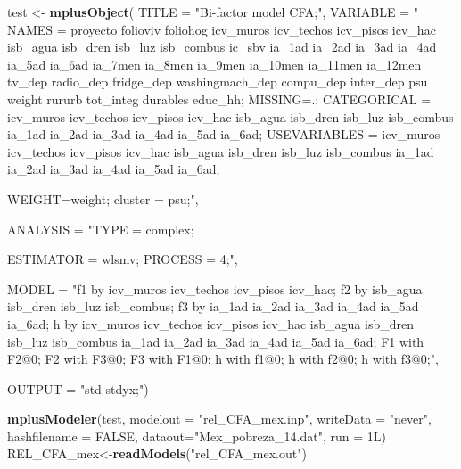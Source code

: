 \documentclass[]{book}
\newenvironment{Shaded}{\begin{snugshade}}{\end{snugshade}}
\newcommand{\DataTypeTok}[1]{\textcolor[rgb]{0.13,0.29,0.53}{#1}}
\newcommand{\KeywordTok}[1]{\textcolor[rgb]{0.13,0.29,0.53}{\textbf{#1}}}
\newcommand{\NormalTok}[1]{#1}
\newcommand{\OtherTok}[1]{\textcolor[rgb]{0.56,0.35,0.01}{#1}}
\newcommand{\StringTok}[1]{\textcolor[rgb]{0.31,0.60,0.02}{#1}}
\begin{document}
\begin{Shaded}
\begin{Highlighting}[]
\NormalTok{test <-}\StringTok{ }\KeywordTok{mplusObject}\NormalTok{(}
\DataTypeTok{TITLE =} \StringTok{"Bi-factor model CFA;"}\NormalTok{,}
   \DataTypeTok{VARIABLE =} \StringTok{"}
\StringTok{     NAMES = proyecto folioviv foliohog icv_muros icv_techos }
\StringTok{             icv_pisos icv_hac isb_agua isb_dren isb_luz isb_combus}
\StringTok{             ic_sbv ia_1ad ia_2ad ia_3ad ia_4ad ia_5ad ia_6ad}
\StringTok{             ia_7men ia_8men ia_9men ia_10men ia_11men ia_12men }
\StringTok{             tv_dep radio_dep fridge_dep}
\StringTok{             washingmach_dep compu_dep inter_dep psu weight}
\StringTok{             rururb tot_integ durables educ_hh; }
\StringTok{MISSING=.;}
\StringTok{     CATEGORICAL = icv_muros icv_techos icv_pisos icv_hac isb_agua}
\StringTok{                   isb_dren isb_luz isb_combus  ia_1ad }
\StringTok{                   ia_2ad ia_3ad ia_4ad ia_5ad ia_6ad;}
\StringTok{     USEVARIABLES = icv_muros icv_techos icv_pisos icv_hac isb_agua}
\StringTok{                   isb_dren isb_luz isb_combus  ia_1ad }
\StringTok{                   ia_2ad ia_3ad ia_4ad ia_5ad ia_6ad;}

\StringTok{WEIGHT=weight;}
\StringTok{cluster = psu;"}\NormalTok{,}

   \DataTypeTok{ANALYSIS =} \StringTok{"TYPE = complex;}

\StringTok{ESTIMATOR = wlsmv;}
\StringTok{PROCESS = 4;"}\NormalTok{,}

\DataTypeTok{MODEL =} \StringTok{"f1 by icv_muros icv_techos icv_pisos icv_hac;}
\StringTok{  f2 by isb_agua}
\StringTok{        isb_dren isb_luz isb_combus;}
\StringTok{  f3 by ia_1ad ia_2ad ia_3ad ia_4ad ia_5ad ia_6ad;}
\StringTok{  h  by icv_muros icv_techos icv_pisos icv_hac isb_agua}
\StringTok{        isb_dren isb_luz isb_combus ia_1ad ia_2ad }
\StringTok{        ia_3ad ia_4ad ia_5ad ia_6ad;}
\StringTok{  F1 with F2@0;}
\StringTok{  F2 with F3@0;}
\StringTok{  F3 with F1@0;}
\StringTok{  h with f1@0;}
\StringTok{  h with f2@0;}
\StringTok{  h with f3@0;"}\NormalTok{,}

\DataTypeTok{OUTPUT =} \StringTok{"std stdyx;"}\NormalTok{)}

\KeywordTok{mplusModeler}\NormalTok{(test, }\DataTypeTok{modelout =} \StringTok{"rel_CFA_mex.inp"}\NormalTok{, }
                    \DataTypeTok{writeData =} \StringTok{"never"}\NormalTok{, }\DataTypeTok{hashfilename =} \OtherTok{FALSE}\NormalTok{, }
                    \DataTypeTok{dataout=}\StringTok{"Mex_pobreza_14.dat"}\NormalTok{, }\DataTypeTok{run =}\NormalTok{ 1L)}
\NormalTok{REL_CFA_mex<-}\KeywordTok{readModels}\NormalTok{(}\StringTok{"rel_CFA_mex.out"}\NormalTok{)}
\end{Highlighting}
\end{Shaded}
\end{document}
